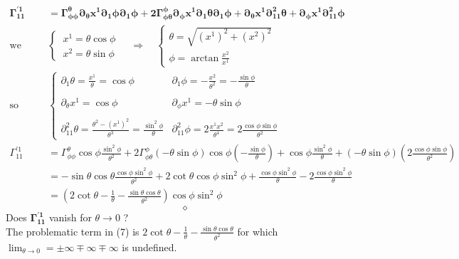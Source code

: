 \begin{align}
\boldsymbol{\Gamma_{11}^{'1}} &=\boldsymbol{\Gamma_{\phi\phi}^{\theta}\partial_{\theta}{x^{1}}\partial_{1}\phi\partial_{1}\phi+ 2\Gamma_{\phi\theta}^{\phi}\partial_{\phi}{x^{1}}\partial_{1}\theta\partial_{1}\phi+\partial_{\theta}{x^{1}}\partial^2_{11}{\theta}+\partial_{\phi}{x^{1}}\partial^2_{11}{\phi}}\\
\text{we have}\quad & \left \{ \begin{array}{l}
\ x^1 = \theta\cos\phi\\
\ x^2 = \theta\sin\phi\
\end{array}\right. \quad \Rightarrow \quad \left \{ \begin{array}{l}
\theta = \sqrt{(x^1)^2+(x^2)^2}\\
\phi = \arctan \frac{x^2}{x^1}
\end{array}\right.\\
\text{so}\ &\left \{ \begin{array}{ll}
\partial_{1} \theta = \frac{x^1}{\theta} = \cos\phi & \partial_{1} \phi = -\frac{x^2}{\theta^2} = -\frac{\sin\phi}{\theta}  \\\\
\partial_{\theta} x^1 = \cos\phi & \partial_{\phi} x^1 = -\theta\sin\phi\\\\
\partial^2_{11} \theta = \frac{\theta^2 -(x^1)^2}{\theta ^3} = \frac{\sin^2\phi}{\theta} & \partial^2_{11} \phi =2\frac{x^1 x^2}{\theta^4}= 2\frac{\cos\phi \sin\phi}{\theta^2}
\end{array}\right.\\
\Gamma_{11}^{'1} &=\Gamma_{\phi\phi}^{\theta}\cos\phi\frac{\sin^2\phi}{\theta^2}+ 2\Gamma_{\phi\theta}^{\phi}(-\theta\sin\phi)\cos\phi(-\frac{\sin\phi}{\theta} )+\cos\phi\frac{\sin^2\phi}{\theta}+(-\theta\sin\phi)(2\frac{\cos\phi \sin\phi}{\theta^2})\\
\ &= -\sin\theta\cos\theta\frac{\cos\phi \sin^2\phi}{\theta^2}+ 2\cot\theta\cos\phi\sin^2\phi+\frac{\cos\phi\sin^2\phi}{\theta}-2\frac{\cos\phi \sin^2\phi}{\theta}\\
\ &= (2\cot\theta -\frac{1}{\theta}-\frac{\sin\theta\cos\theta}{\theta^2})\cos\phi\sin^2\phi
\end{align}
$$\diamond$$
\newpage
Does $\boldsymbol{\Gamma_{11}^{'1}}$ vanish for $\theta \rightarrow0$ ? 
\\The problematic term in (7) is $2\cot\theta -\frac{1}{\theta}-\frac{\sin\theta\cos\theta}{\theta^2}$ for which $\lim_{\theta \to 0 }= \pm \infty \mp \infty \mp \infty$ is undefined. 
